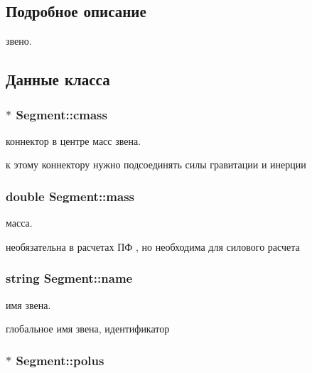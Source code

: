 \subsection{Подробное описание}
звено. 

\subsection{Данные класса}
\hypertarget{class_segment_a0f3dc25d68321cd5c3e8595fcdbc2ea8}{
\subsubsection[{cmass}]{$\ast$ {\bf Segment::cmass}}}
\label{class_segment_a0f3dc25d68321cd5c3e8595fcdbc2ea8}


коннектор в центре масс звена. 

к этому коннектору нужно подсоединять силы гравитации и инерции \hypertarget{class_segment_ae2ac875b86cea3b0dbd60b318d953588}{
\subsubsection[{mass}]{\setlength{\rightskip}{0pt plus 5cm}double {\bf Segment::mass}}}
\label{class_segment_ae2ac875b86cea3b0dbd60b318d953588}


масса. 

необязательна в расчетах ПФ , но необходима для силового расчета \hypertarget{class_segment_a0317dfdef4af06341f86ffbd77aeefd8}{
\subsubsection[{name}]{\setlength{\rightskip}{0pt plus 5cm}string {\bf Segment::name}}}
\label{class_segment_a0317dfdef4af06341f86ffbd77aeefd8}


имя звена. 

глобальное имя звена, идентификатор \hypertarget{class_segment_ab137465e247c4b7f5584e4ad558e4138}{
\subsubsection[{polus}]{$\ast$ {\bf Segment::polus}}}
\label{class_segment_ab137465e247c4b7f5584e4ad558e4138}


